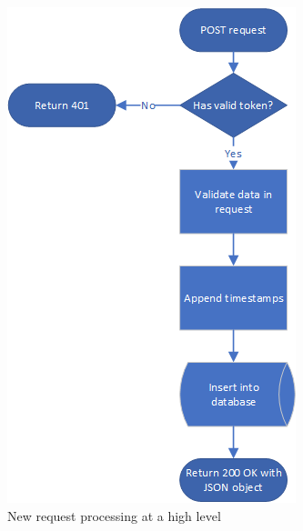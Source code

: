 \documentclass[../main.tex]{subfiles}
\begin{document}
\begin{figure}[H]
    \centering
    \includegraphics{img/middleware_new_request.png}
    \caption{New request processing at a high level}
    \label{fig:middleware_new_request}
\end{figure}
\end{document}
